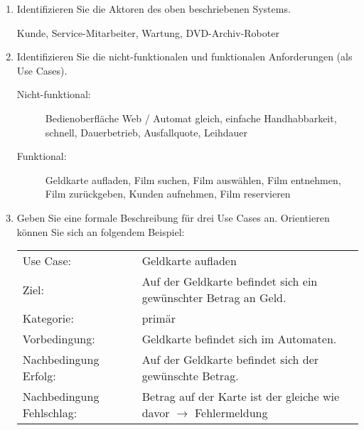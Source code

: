 \documentclass{bschlangaul-aufgabe}
\begin{document}
\begin{enumerate}


\item Identifizieren Sie die Aktoren des oben beschriebenen Systems.

\begin{liAntwort}
Kunde, Service-Mitarbeiter, Wartung, DVD-Archiv-Roboter
\end{liAntwort}


\item Identifizieren Sie die nicht-funktionalen und funktionalen Anforderungen (als Use Cases).

\begin{liAntwort}
\begin{description}
\item[Nicht-funktional:] Bedienoberfläche Web / Automat gleich, einfache
Handhabbarkeit, schnell, Dauerbetrieb, Ausfallquote, Leihdauer

\item[Funktional:] Geldkarte aufladen, Film suchen, Film auswählen, Film
entnehmen, Film zurückgeben, Kunden aufnehmen, Film reservieren
\end{description}
\end{liAntwort}

\item Geben Sie eine formale Beschreibung für drei Use Cases an.
Orientieren können Sie sich an folgendem Beispiel:

\begin{liAntwort}

\begin{tabularx}{\linewidth}{p{3cm}X}
Use Case: &
Geldkarte aufladen \\

Ziel: &
Auf der Geldkarte befindet sich ein gewünschter Betrag an Geld. \\

Kategorie: & primär \\

Vorbedingung: & Geldkarte befindet sich im Automaten. \\

Nachbedingung Erfolg: &
Auf der Geldkarte befindet sich der gewünschte Betrag. \\

Nachbedingung Fehlschlag: &
Betrag auf der Karte ist der gleiche wie davor  $\rightarrow$
Fehlermeldung \\


\end{tabularx}
\end{liAntwort}
\end{enumerate}
\end{document}
